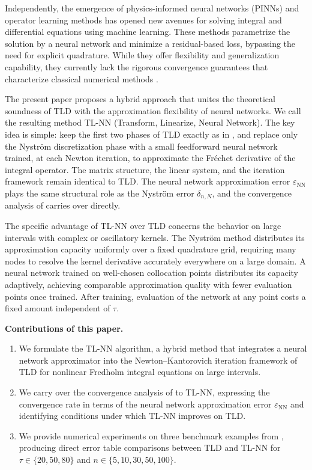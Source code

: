 \documentclass[12pt, a4paper]{article}
\newcommand{\epsNN}{\varepsilon_{\mathrm{NN}}}
\begin{document}
Independently, the emergence of physics-informed neural
networks (PINNs) \cite{raissi2019} and operator learning
methods \cite{lu2021, kovachki2023} has opened new avenues
for solving integral and differential equations using machine
learning.
These methods parametrize the solution by a neural network
and minimize a residual-based loss, bypassing the need for
explicit quadrature.
While they offer flexibility and generalization capability,
they currently lack the rigorous convergence guarantees that
characterize classical numerical methods \cite{lu2021}.

The present paper proposes a hybrid approach that unites the
theoretical soundness of TLD with the approximation
flexibility of neural networks.
We call the resulting method TL-NN (Transform, Linearize,
Neural Network).
The key idea is simple: keep the first two phases of TLD
exactly as in \cite{sedka2025}, and replace only the
Nystr\"{o}m discretization phase with a small feedforward
neural network trained, at each Newton iteration, to
approximate the Fr\'{e}chet derivative of the integral
operator.
The matrix structure, the linear system, and the iteration
framework remain identical to TLD.
The neural network approximation error $\epsNN$ plays the
same structural role as the Nystr\"{o}m error $\delta_{n,N}$,
and the convergence analysis of \cite{sedka2025} carries over
directly.

The specific advantage of TL-NN over TLD concerns the
behavior on large intervals with complex or oscillatory
kernels.
The Nystr\"{o}m method distributes its approximation capacity
uniformly over a fixed quadrature grid, requiring many nodes
to resolve the kernel derivative accurately everywhere on a
large domain.
A neural network trained on well-chosen collocation points
distributes its capacity adaptively, achieving comparable
approximation quality with fewer evaluation points once
trained.
After training, evaluation of the network at any point costs
a fixed amount independent of $\tau$.

\textbf{Contributions of this paper.}
\begin{enumerate}
  \item We formulate the TL-NN algorithm, a hybrid method
    that integrates a neural network approximator into the
    Newton--Kantorovich iteration framework of TLD for
    nonlinear Fredholm integral equations on large intervals.
  \item We carry over the convergence analysis of
    \cite{sedka2025} to TL-NN, expressing the convergence
    rate in terms of the neural network approximation error
    $\epsNN$ and identifying conditions under which TL-NN
    improves on TLD.
  \item We provide numerical experiments on three benchmark
    examples from \cite{sedka2025}, producing direct
    error table comparisons between TLD and TL-NN for
    $\tau \in \{20, 50, 80\}$ and $n \in \{5, 10, 30, 50, 100\}$.
\end{enumerate}
\end{document}
